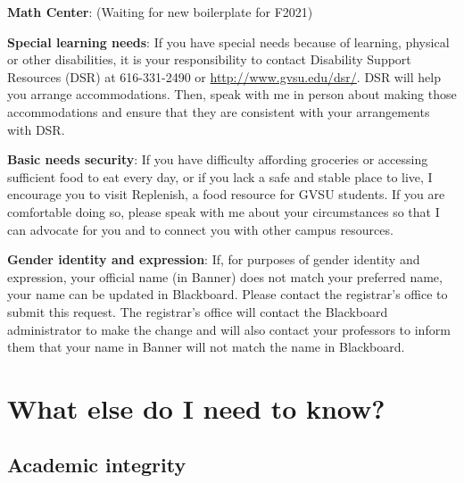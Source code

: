 \documentclass[]{article}
\begin{document}
\textbf{Math Center}: (Waiting for new boilerplate for F2021) 

\textbf{Special learning needs}: If you have special needs because of learning, physical or other disabilities, it is your responsibility to contact Disability Support Resources (DSR) at 616-331-2490 or \url{http://www.gvsu.edu/dsr/}. DSR will help you arrange accommodations. Then, speak with me in person about making those accommodations and ensure that they are consistent with your arrangements with DSR.

\textbf{Basic needs security}: If you have difficulty affording groceries or accessing sufficient food to eat every day, or if you lack a safe and stable place to live, I encourage you to visit Replenish, a food resource for GVSU students. If you are comfortable doing so, please speak with me about your circumstances so that I can advocate for you and to connect you with other campus resources.

\textbf{Gender identity and expression}: If, for purposes of gender identity and expression, your official name (in Banner) does not match your preferred name, your name can be updated in Blackboard. Please contact the registrar's office to submit this request. The registrar's office will contact the Blackboard administrator to make the change and will also contact your professors to inform them that your name in Banner will not match the name in Blackboard.

\section{What else do I need to know?}

\subsection{Academic integrity}
\end{document}
